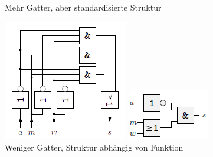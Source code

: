 \documentclass[12pt]{report}
\begin{document}
\begin{figure}[H]
  \begin{minipage}[t]{0.4\textwidth}
    \caption{Mehr Gatter, aber standardisierte Struktur}
    \includegraphics[width=\textwidth]{PLA_example_normal}
  \end{minipage}
  \hfill
  \begin{minipage}[t]{0.4\textwidth}
    \caption{Weniger Gatter, Struktur abhängig von Funktion}
    \centering
    \includegraphics[width=\textwidth]{PLA_example_original}
  \end{minipage}
\end{figure}
\end{document}
